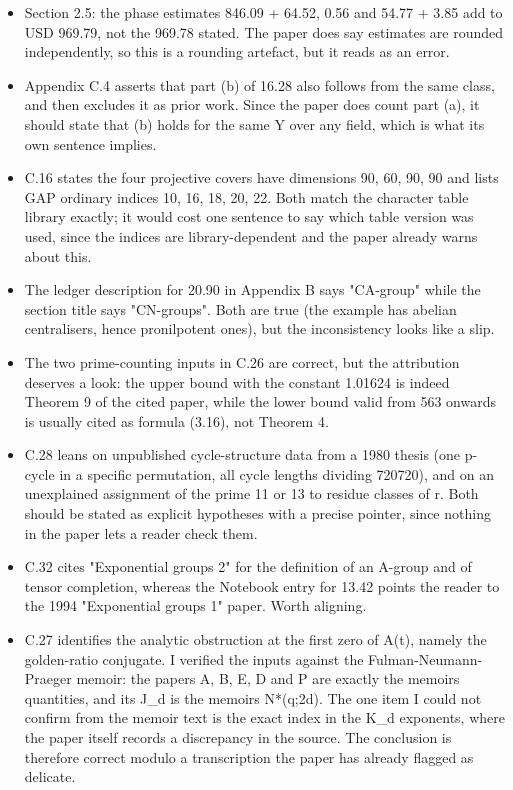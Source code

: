 \begin{itemize}
\tightlist
\item
  Section 2.5: the phase estimates 846.09 + 64.52, 0.56 and 54.77 + 3.85
  add to USD 969.79, not the 969.78 stated. The paper does say estimates
  are rounded independently, so this is a rounding artefact, but it
  reads as an error.
\item
  Appendix C.4 asserts that part (b) of 16.28 also follows from the same
  class, and then excludes it as prior work. Since the paper does count
  part (a), it should state that (b) holds for the same Y over any
  field, which is what its own sentence implies.
\item
  C.16 states the four projective covers have dimensions 90, 60, 90, 90
  and lists GAP ordinary indices 10, 16, 18, 20, 22. Both match the
  character table library exactly; it would cost one sentence to say
  which table version was used, since the indices are library-dependent
  and the paper already warns about this.
\item
  The ledger description for 20.90 in Appendix B says "CA-group" while
  the section title says "CN-groups". Both are true (the example has
  abelian centralisers, hence pronilpotent ones), but the inconsistency
  looks like a slip.
\item
  The two prime-counting inputs in C.26 are correct, but the attribution
  deserves a look: the upper bound with the constant 1.01624 is indeed
  Theorem 9 of the cited paper, while the lower bound valid from 563
  onwards is usually cited as formula (3.16), not Theorem 4.
\item
  C.28 leans on unpublished cycle-structure data from a 1980 thesis (one
  p-cycle in a specific permutation, all cycle lengths dividing 720720),
  and on an unexplained assignment of the prime 11 or 13 to residue
  classes of r. Both should be stated as explicit hypotheses with a
  precise pointer, since nothing in the paper lets a reader check them.
\item
  C.32 cites "Exponential groups 2" for the definition of an A-group and
  of tensor completion, whereas the Notebook entry for 13.42 points the
  reader to the 1994 "Exponential groups 1" paper. Worth aligning.
\item
  C.27 identifies the analytic obstruction at the first zero of A(t),
  namely the golden-ratio conjugate. I verified the inputs against the
  Fulman-Neumann-Praeger memoir: the paper\textquotesingle s A, B, E, D
  and P are exactly the memoir\textquotesingle s quantities, and its
  J\_d is the memoir\textquotesingle s N*(q;2d). The one item I could
  not confirm from the memoir text is the exact index in the K\_d
  exponents, where the paper itself records a discrepancy in the source.
  The conclusion is therefore correct modulo a transcription the paper
  has already flagged as delicate.
\end{itemize}

